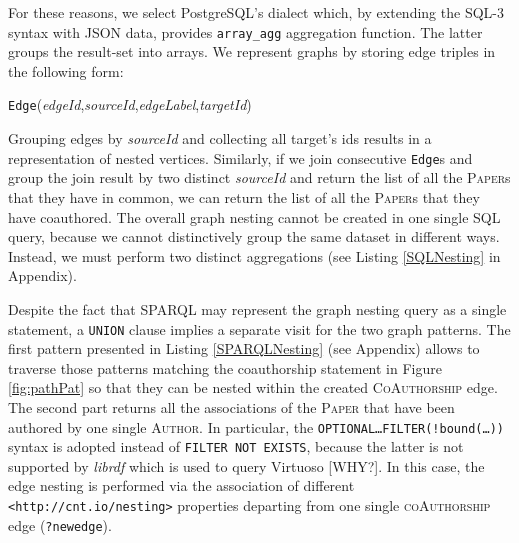 For these reasons, we select PostgreSQL's dialect which, by extending the SQL-3 syntax with JSON data, provides \texttt{array\_agg} aggregation function. The latter groups the result-set into arrays.  We  represent  graphs by  storing edge triples in the following form:
\begin{center}
 \texttt{Edge}(\textit{edgeId},\;\textit{sourceId},\;\textit{edgeLabel},\;\textit{targetId})
\end{center}
Grouping edges by \textit{sourceId} and collecting all target's ids results in a representation of nested vertices. Similarly, if we join consecutive \texttt{Edge}s and group the join result by two distinct \textit{sourceId} and return the list of all the \textsc{Paper}s that they have in common, we can return the list of all the \textsc{Paper}s that they have coauthored. The overall graph nesting cannot be created in one single SQL query, because we cannot distinctively group the same dataset in different ways. Instead, we must perform two distinct aggregations (see Listing \ref{SQLNesting} in Appendix).


Despite the fact that SPARQL  may represent the graph nesting query as a single statement, a \texttt{UNION} clause implies a separate visit for the two graph patterns. The first pattern presented in Listing \ref{SPARQLNesting} (see Appendix) allows to traverse those  patterns matching the coauthorship statement in Figure \ref{fig:pathPat} so that they can be nested within the created \textsc{CoAuthorship} edge. The second part returns all the associations of the \textsc{Paper} that have been authored by one single \textsc{Author}. In particular, the \texttt{OPTIONAL\dots FILTER(!bound(\dots))} syntax is adopted instead of \texttt{FILTER NOT EXISTS}, because the latter is not supported by \textit{librdf} which is used to query Virtuoso [WHY?]. In this case, the edge nesting is performed via the association of different \texttt{<http://cnt.io/nesting>} properties departing from one single  \textsc{coAuthorship} edge (\texttt{?newedge}).

